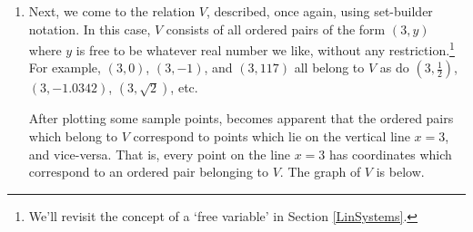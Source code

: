 \documentclass{ximera}
\begin{document}
\begin{example}
\begin{explanation}
\begin{enumerate}
\begin{enumerate}
We plot a few of these points and use some periods of ellipsis to indicate the complete graph contains additional points not in the current field of view. Our graph of the relation  $P$ is below.

\begin{image}
% 
 \end{image}

\item  Next, we come to the relation $V$,  described, once again, using set-builder notation.  In this case, $V$ consists of all ordered pairs of the form $(3,y)$ where $y$  is free to be whatever real number we like, without any restriction.\footnote{We'll revisit the concept of a `free variable' in Section \ref{LinSystems}.}  For example, $(3,0)$, $(3,-1)$, and $(3,117)$ all belong to $V$ as do $\left(3, \frac{1}{2}\right)$, $(3,-1.0342)$, $(3, \sqrt{2})$, etc. 

After plotting some sample points, becomes apparent that the ordered pairs which belong to  $V$ correspond to points which lie on the vertical line $x = 3$, and vice-versa. That is, every point on the line $x=3$ has coordinates which correspond to an ordered pair belonging to $V$. The graph of $V$ is below.


\end{enumerate}
\end{enumerate}
\end{explanation}
\end{example}
\end{document}
